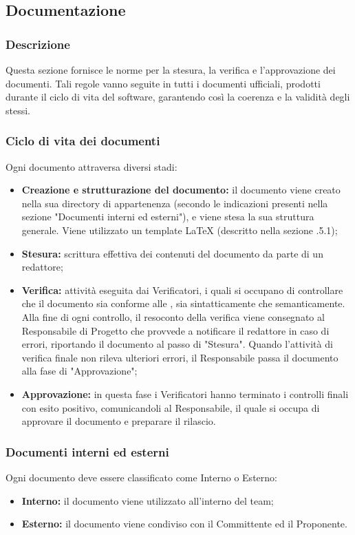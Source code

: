 \subsection{Documentazione}
    \subsubsection{Descrizione}
      Questa sezione fornisce le norme per la stesura, la verifica e l'approvazione dei documenti. Tali regole vanno seguite in tutti i documenti ufficiali, prodotti durante il ciclo di vita del software, garantendo così la coerenza e la validità degli stessi.

    \subsubsection{Ciclo di vita dei documenti}
      Ogni documento attraversa diversi stadi:
      \begin{itemize}
        \item \textbf{Creazione e strutturazione del documento:} il documento viene creato nella sua directory di appartenenza (secondo le indicazioni presenti nella sezione "Documenti interni ed esterni"), e viene stesa la sua struttura generale. Viene utilizzato un template \LaTeX{} (descritto nella sezione .5.1);
        \item \textbf{Stesura:} scrittura effettiva dei contenuti del documento da parte di un redattore;
        \item \textbf{Verifica:} attività eseguita dai Verificatori, i quali si occupano di controllare che il documento sia conforme alle \textit{\NdP{}}, sia sintatticamente che semanticamente. Alla fine di ogni controllo, il resoconto della verifica viene consegnato al Responsabile di Progetto che provvede a notificare il redattore in caso di errori, riportando il documento al passo di "Stesura". Quando l'attività di verifica finale non rileva ulteriori errori, il Responsabile passa il documento alla fase di "Approvazione";
        \item \textbf{Approvazione:} in questa fase i Verificatori hanno terminato i controlli finali con esito positivo, comunicandoli al Responsabile, il quale si occupa di approvare il documento e preparare il rilascio.
      \end{itemize}

    \subsubsection{Documenti interni ed esterni}
      Ogni documento deve essere classificato come Interno o Esterno:
      \begin{itemize}
        \item \textbf{Interno:} il documento viene utilizzato all'interno del team;
        \item \textbf{Esterno:} il documento viene condiviso con il Committente ed il Proponente.
      \end{itemize}

